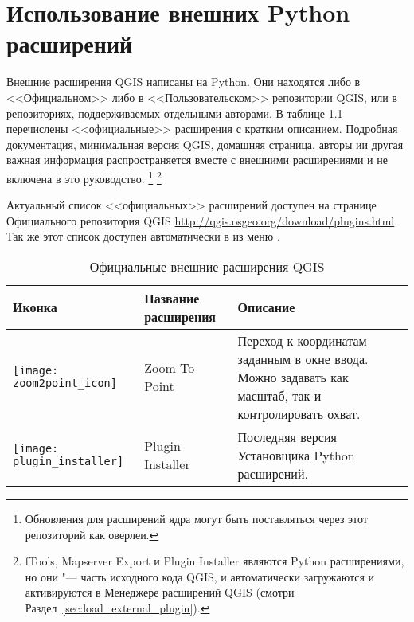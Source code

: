 
\chapter{Использование внешних Python расширений}\label{sec:external_plugins}


Внешние расширения QGIS написаны на Python. Они находятся либо в <<Официальном>>
либо в <<Пользовательском>> репозитории QGIS, или в репозиториях, поддерживаемых
отдельными авторами.
В таблице \ref{tab:external_plugins} перечислены <<официальные>> расширения с
кратким описанием.
Подробная документация, минимальная версия QGIS, домашняя страница, авторы
ии другая важная информация распространяется вместе с внешними расширениями
и не включена в это руководство.
\footnote{Обновления для расширений ядра могут быть поставляться через этот
репозиторий как оверлеи.}
\footnote{fTools, Mapserver Export и Plugin Installer являются Python
расширениями, но они "--- часть исходного кода QGIS, и автоматически
загружаются и активируются в Менеджере расширений QGIS
(смотри Раздел~\ref{sec:load_external_plugin}).}

Актуальный список <<официальных>> расширений доступен на странице Официального
репозитория QGIS \url{http://qgis.osgeo.org/download/plugins.html}. Так же
этот список доступен автоматически в 
из меню .

\begin{table}[H]
\centering
 \begin{tabular}{|l|l|p{8cm}|}
\hline \textbf{Иконка} & \textbf{Название расширения} & \textbf{Описание}\\
\hline
\texttt{[image: zoom2point\_icon]}
 & Zoom To Point \index{plugins!Zoom To Point} & Переход к координатам
  заданным в окне ввода. Можно задавать как масштаб, так и
  контролировать охват.\\
\hline
\texttt{[image: plugin\_installer]}
 & Plugin Installer \index{plugins!Plugin Installer} & Последняя версия Установщика Python расширений.\\
\hline
\end{tabular}
\caption{Официальные внешние расширения QGIS}\label{tab:external_plugins}
\end{table}

